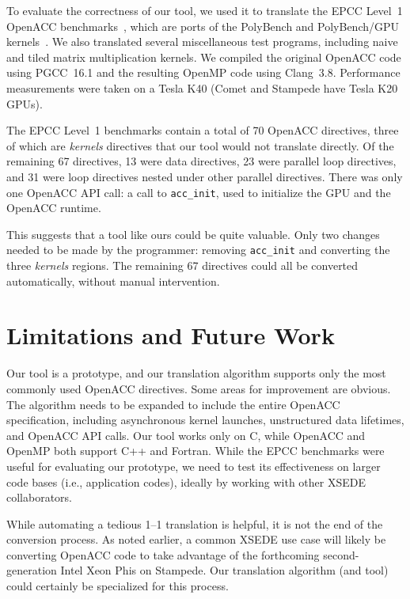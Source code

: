 \documentclass{sig-alternate-05-2015}
\begin{document}
To evaluate the correctness of our tool, we used it to translate the EPCC
Level~1 OpenACC benchmarks~\cite{epcc}, which are ports of the PolyBench and
PolyBench/GPU kernels~\cite{polybench}.  We also translated several
miscellaneous test programs, including naive and tiled matrix multiplication
kernels.  We compiled the original OpenACC code using PGCC~16.1 and the
resulting OpenMP code using Clang~3.8.  Performance measurements were taken on
a Tesla K40 (Comet and Stampede have Tesla K20 GPUs).

The EPCC Level~1 benchmarks contain a total of 70 OpenACC directives, three of
which are \emph{kernels} directives that our tool would not translate directly.
Of the remaining 67 directives, 13 were data directives, 23 were parallel loop
directives, and 31 were loop directives nested under other parallel directives.
There was only one OpenACC API call: a call to \texttt{acc\_init}, used to
initialize the GPU and the OpenACC runtime.

This suggests that a tool like ours could be quite valuable.  Only two changes
needed to be made by the programmer: removing \texttt{acc\_init} and converting
the three \emph{kernels} regions.  The remaining 67 directives could all be
converted automatically, without manual intervention.

\section{Limitations and Future Work}
\label{sec:future}

Our tool is a prototype, and our translation algorithm supports only the most
commonly used OpenACC directives.  Some areas for improvement are obvious.  The
algorithm needs to be expanded to include the entire OpenACC specification,
including asynchronous kernel launches, unstructured data lifetimes, and
OpenACC API calls.  Our tool works only on C, while OpenACC and OpenMP both
support C++ and Fortran.  While the EPCC benchmarks were useful for evaluating
our prototype, we need to test its effectiveness on larger code bases (i.e.,
application codes), ideally by working with other XSEDE collaborators.

While automating a tedious 1--1 translation is helpful, it is not the end of
the conversion process.  As noted earlier, a common XSEDE use case will likely
be converting OpenACC code to take advantage of the forthcoming
second-generation Intel Xeon Phis on Stampede.  Our translation algorithm (and
tool) could certainly be specialized for this process.
\end{document}
